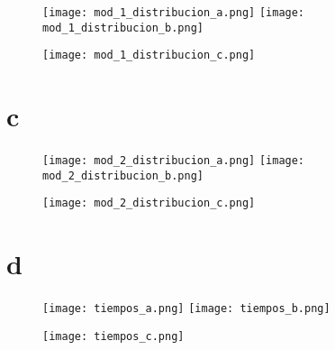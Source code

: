 \begin{figure}[h]
	\texttt{[image: mod\_1\_distribucion\_a.png]}
	\texttt{[image: mod\_1\_distribucion\_b.png]}
\end{figure}
\begin{figure}[h]
	\texttt{[image: mod\_1\_distribucion\_c.png]}
\end{figure}

\newpage

\section{c}

\begin{figure}[h]
	\texttt{[image: mod\_2\_distribucion\_a.png]}
	\texttt{[image: mod\_2\_distribucion\_b.png]}
\end{figure}
\begin{figure}[h]
	\texttt{[image: mod\_2\_distribucion\_c.png]}
\end{figure}

\newpage

\section{d}

\begin{figure}[h]
	\texttt{[image: tiempos\_a.png]}
	\texttt{[image: tiempos\_b.png]}
\end{figure}
\begin{figure}[h]
	\texttt{[image: tiempos\_c.png]}
\end{figure}


